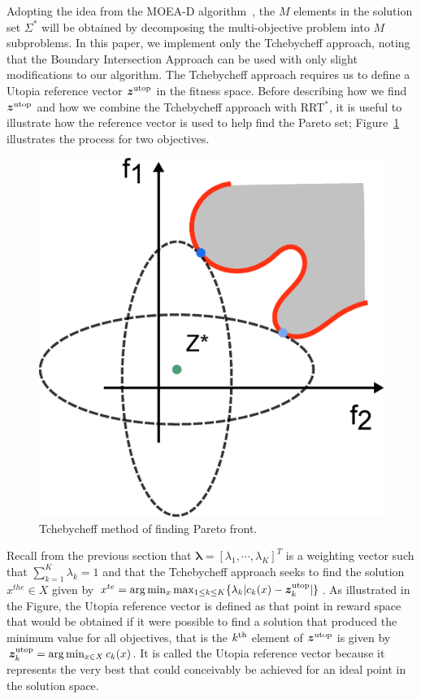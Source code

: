 \documentclass{article}
\begin{document}
Adopting the idea from the MOEA-D algorithm~\cite{4358754}, the $M$ elements in the solution set $\Sigma^{*}$ will be obtained by decomposing the multi-objective problem into $ M $ subproblems.  
In this paper, we implement only the Tchebycheff approach, noting that the Boundary Intersection Approach can be used with only slight modifications to our algorithm. The Tchebycheff approach requires us to define a Utopia reference vector $ \bm{z}^{\rm utop} $ in the fitness space. 
Before describing how we find $ \bm{z}^{\rm utop} $ and how we combine the Tchebycheff approach with RRT$^{*}$, it is useful to illustrate how the reference vector is used to help find the Pareto set; Figure~\ref{fig:Tchebycheff} illustrates the process for two objectives.  
\begin{figure}
\centering
\includegraphics[width=0.4\linewidth]{fig/Tchebycheff2.png}
\caption{Tchebycheff method of finding Pareto front.}
\label{fig:Tchebycheff}
\end{figure}
Recall from the previous section that  $ \bm{\lambda} = [ \lambda_{1} , \cdots , \lambda_{K}  ]^{T} $ is a weighting vector such that $ \sum_{k=1}^{K} \lambda_{k} = 1 $ and that the Tchebycheff approach seeks to find the solution $ x^{the}\in X $ given by $ x^{te} = \arg\min_x \max_{1 \leq k \leq K}  \{ \lambda_{k} | c_{k}(x) - \bm{z}^{\rm utop}_{k}  | \} $.  
As illustrated in the Figure, the Utopia reference vector is defined as that point in reward space that would be obtained if it were possible to find a solution that produced the minimum value for all objectives, that is the $k^{\rm th}$ element of $\bm{z}^{\rm utop}$ is given by $\bm{z}^{\rm utop}_{k} = \arg \min_{x \in X} c_{k}(x)$.  
It is called the Utopia reference vector because it represents the very best that could conceivably be achieved for an ideal point in the solution space.
\end{document}
